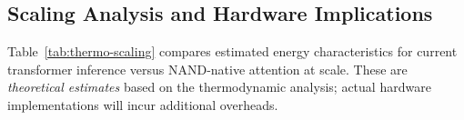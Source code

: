 \subsection{Scaling Analysis and Hardware Implications}













Table~\ref{tab:thermo-scaling} compares estimated energy characteristics for current transformer inference versus NAND-native attention at scale. These are \emph{theoretical estimates} based on the thermodynamic analysis; actual hardware implementations will incur additional overheads.













